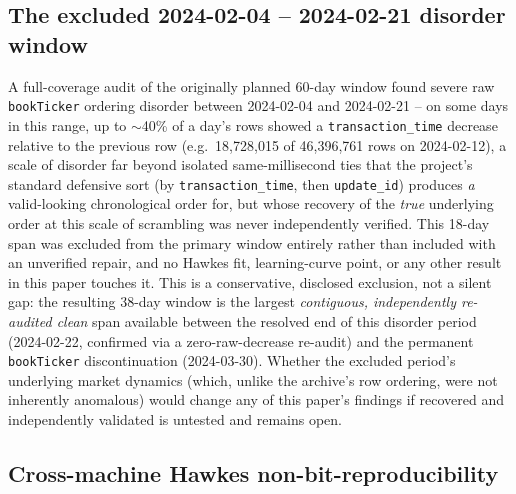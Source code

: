 \subsection{The excluded 2024-02-04 -- 2024-02-21 disorder window}
\label{sec:limitations-disorder}

A full-coverage audit of the originally planned 60-day window found
severe raw \texttt{bookTicker} ordering disorder between 2024-02-04 and
2024-02-21 -- on some days in this range, up to $\sim$40\% of a day's
rows showed a \texttt{transaction\_time} decrease relative to the
previous row (e.g.\ 18{,}728{,}015 of 46{,}396{,}761 rows on 2024-02-12),
a scale of disorder far beyond isolated same-millisecond ties that the
project's standard defensive sort (by \texttt{transaction\_time}, then
\texttt{update\_id}) produces \emph{a} valid-looking chronological order
for, but whose recovery of the \emph{true} underlying order at this scale
of scrambling was never independently verified. This 18-day span was
excluded from the primary window entirely rather than included with an
unverified repair, and no Hawkes fit, learning-curve point, or any other
result in this paper touches it. This is a conservative, disclosed
exclusion, not a silent gap: the resulting 38-day window is the largest
\emph{contiguous, independently re-audited clean} span available between
the resolved end of this disorder period (2024-02-22, confirmed via a
zero-raw-decrease re-audit) and the permanent \texttt{bookTicker}
discontinuation (2024-03-30). Whether the excluded period's underlying
market dynamics (which, unlike the archive's row ordering, were not
inherently anomalous) would change any of this paper's findings if
recovered and independently validated is untested and remains open.

\subsection{Cross-machine Hawkes non-bit-reproducibility}
\label{sec:limitations-reproducibility}

